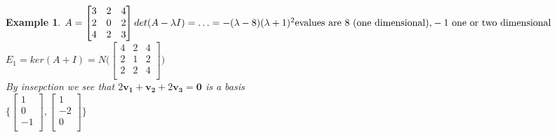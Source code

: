 \documentclass[a4paper,12pt]{article}
\newtheorem{example}{Example}
\renewcommand{\vec}[1]{\mathbf{#1}}
\begin{document}
\begin{example}$
  A=
  \begin{bmatrix}
    3 & 2 & 4 \\
    2 & 0 & 2 \\ 
    4 & 2 & 3 \\
  \end{bmatrix}\\ 
  det(A-\lambda I) = \ldots = -(\lambda - 8)(\lambda + 1)^{2} \\ 
  \text{evalues are 8 (one dimensional),} -1 \text{ one or two dimensional}$\\
  $E_{1} = ker(A + I) = N\bigg(
    \begin{bmatrix}
      4 & 2 & 4\\ 
      2 & 1 & 2\\ 
      2 & 2 & 4\\
    \end{bmatrix}
  \bigg)$\\ 
  By insepction we see that $2\vec{v_{1}} + \vec{v_{2}} + 2\vec{v_{3}} = \vec{0}$
  is a basis\\ $
  \Bigg\{\begin{bmatrix}
   1 \\ 
   0 \\ 
   -1 \\ 
  \end{bmatrix}, \begin{bmatrix}
   1 \\ 
   -2 \\ 
   0 \\ 
  \end{bmatrix}\Bigg\}$
\end{example}
\end{document}
